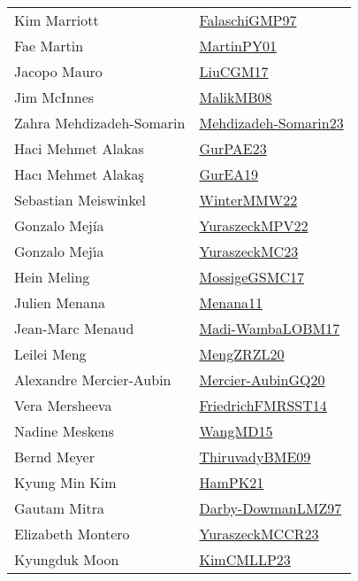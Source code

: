 {\begin{longtable}{p{4cm}p{20cm}}
Kim Marriott & \href{articles/FalaschiGMP97.pdf}{FalaschiGMP97}\cite{FalaschiGMP97} \\
Fae Martin & \href{articles/MartinPY01.pdf}{MartinPY01}\cite{MartinPY01} \\
Jacopo Mauro & \href{papers/LiuCGM17.pdf}{LiuCGM17}\cite{LiuCGM17} \\
Jim McInnes & \href{}{MalikMB08}\cite{MalikMB08} \\
Zahra Mehdizadeh{-}Somarin & \href{papers/Mehdizadeh-Somarin23.pdf}{Mehdizadeh-Somarin23}\cite{Mehdizadeh-Somarin23} \\
Haci Mehmet Alakas & \href{articles/GurPAE23.pdf}{GurPAE23}\cite{GurPAE23} \\
Hacı Mehmet Alakaş & \href{articles/GurEA19.pdf}{GurEA19}\cite{GurEA19} \\
Sebastian Meiswinkel & \href{papers/WinterMMW22.pdf}{WinterMMW22}\cite{WinterMMW22} \\
Gonzalo Mej{\'i}a & \href{articles/YuraszeckMPV22.pdf}{YuraszeckMPV22}\cite{YuraszeckMPV22} \\
Gonzalo Mej{\'{\i}}a & \href{papers/YuraszeckMC23.pdf}{YuraszeckMC23}\cite{YuraszeckMC23} \\
Hein Meling & \href{papers/MossigeGSMC17.pdf}{MossigeGSMC17}\cite{MossigeGSMC17} \\
Julien Menana & \href{}{Menana11}\cite{Menana11} \\
Jean{-}Marc Menaud & \href{papers/Madi-WambaLOBM17.pdf}{Madi-WambaLOBM17}\cite{Madi-WambaLOBM17} \\
Leilei Meng & \href{articles/MengZRZL20.pdf}{MengZRZL20}\cite{MengZRZL20} \\
Alexandre Mercier{-}Aubin & \href{papers/Mercier-AubinGQ20.pdf}{Mercier-AubinGQ20}\cite{Mercier-AubinGQ20} \\
Vera Mersheeva & \href{}{FriedrichFMRSST14}\cite{FriedrichFMRSST14} \\
Nadine Meskens & \href{articles/WangMD15.pdf}{WangMD15}\cite{WangMD15} \\
Bernd Meyer & \href{papers/ThiruvadyBME09.pdf}{ThiruvadyBME09}\cite{ThiruvadyBME09} \\
Kyung Min Kim & \href{articles/HamPK21.pdf}{HamPK21}\cite{HamPK21} \\
Gautam Mitra & \href{articles/Darby-DowmanLMZ97.pdf}{Darby-DowmanLMZ97}\cite{Darby-DowmanLMZ97} \\
Elizabeth Montero & \href{articles/YuraszeckMCCR23.pdf}{YuraszeckMCCR23}\cite{YuraszeckMCCR23} \\
Kyungduk Moon & \href{papers/KimCMLLP23.pdf}{KimCMLLP23}\cite{KimCMLLP23} \\

\end{longtable}}
